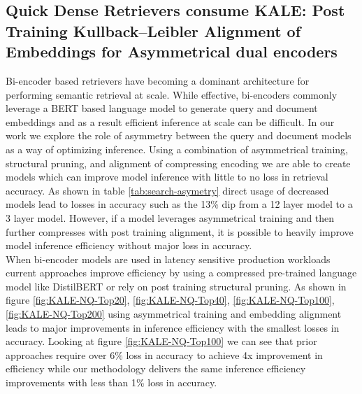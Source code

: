 \subsection{Quick Dense Retrievers consume KALE: Post Training Kullback–Leibler Alignment of Embeddings for Asymmetrical dual encoders}
Bi-encoder based retrievers have becoming a dominant architecture for performing semantic retrieval at scale. While effective, bi-encoders commonly leverage a BERT based language model to generate query and document embeddings and as a result efficient inference at scale can be difficult. In our work we explore the role of asymmetry between the query and document models as a way of optimizing inference. Using a combination of asymmetrical training, structural pruning, and alignment of compressing encoding we are able to create models which can improve model inference with little to no loss in retrieval accuracy. As shown in table \ref{tab:search-asymetry} direct usage of decreased models lead to losses in accuracy such as the 13\% dip from a 12 layer model to a 3 layer model. However, if a model leverages asymmetrical training and then further compresses with post training alignment, it is possible to heavily improve model inference efficiency without major loss in accuracy. \\ 
When bi-encoder models are used in latency sensitive production workloads current approaches improve efficiency by using a compressed pre-trained language model like DistilBERT \cite{Sanh2019DistilBERTAD} or rely on post training structural pruning. As shown in figure \ref{fig:KALE-NQ-Top20}, \ref{fig:KALE-NQ-Top40}, \ref{fig:KALE-NQ-Top100},\ref{fig:KALE-NQ-Top200} using asymmetrical training and embedding alignment leads to major improvements in inference efficiency with the smallest losses in accuracy. Looking at figure \ref{fig:KALE-NQ-Top100} we can see that prior approaches require over $6\%$ loss in accuracy to achieve 4x improvement in efficiency while our methodology delivers the same inference efficiency improvements with less than 1\% loss in accuracy. 
